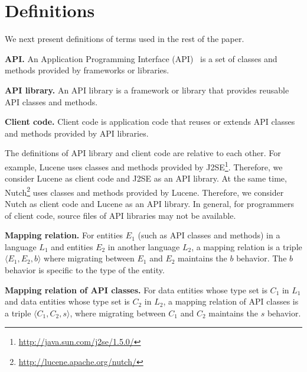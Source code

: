 \section{Definitions}
\label{sec:mapping}

We next present definitions of terms used in the rest of the paper.

\textbf{API.} An Application Programming Interface (API)~\cite{orenstein2000quickstudy}
is a set of classes and methods provided by frameworks or libraries.

\textbf{API library.} An API library is a framework
or library that provides reusable API classes and methods.

\textbf{Client code.} Client code is application code
that reuses or extends API classes and methods provided by API
libraries.

The definitions of API library and client code are
relative to each other. For example, Lucene uses classes and methods provided by
J2SE\footnote{\url{http://java.sun.com/j2se/1.5.0/}}. Therefore, we consider Lucene as client code and J2SE as an API library. At the same time, Nutch\footnote{\url{http://lucene.apache.org/nutch/}} uses classes and methods provided by Lucene. Therefore, we consider Nutch as client code and Lucene as an API library. In
general, for programmers of client code, source files of API libraries may not be available.

\textbf{Mapping relation.} For entities $E_1$ (such as API classes and methods) in a
language $L_1$ and entities $E_2$ in another
language $L_2$, a mapping relation is a triple $\langle E_1, E_2,
b \rangle$ where migrating between $E_1$ and $E_2$ maintains the $b$ behavior.
The $b$ behavior is specific to the type of the entity.

%

\textbf{Mapping relation of API classes.} For data entities whose type set is $C_1$ in $L_1$ and data entities whose type set is $C_2$ in
$L_2$, a mapping relation of API classes is a triple
$\langle C_1, C_2, s \rangle$, where migrating between $C_1$ and $C_2$ maintains the $s$ behavior.

